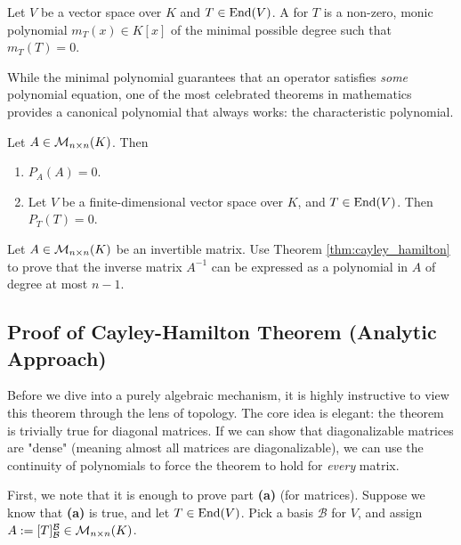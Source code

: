 \begin{definition}\label{def:minimal_poly}
  Let $V$ be a vector space over $K$ and $T \in \operatorname{End}(V)$. A  for $T$ is a non-zero, monic polynomial $m_T(x) \in K[x]$ of the minimal possible degree such that $m_T(T) = 0$.
\end{definition}

While the minimal polynomial guarantees that an operator satisfies \textit{some} polynomial equation, one of the most celebrated theorems in mathematics provides a canonical polynomial that always works: the characteristic polynomial.

\begin{theorem}\label{thm:cayley_hamilton}
  Let $A \in \mathcal{M}_{n \times n}(K)$. Then
  \begin{enumerate}
    \item  $P_A(A) = 0$.
    \item Let $V$ be a finite-dimensional vector space over $K$, and $T \in \operatorname{End}(V)$. Then $P_T(T) = 0$.
  \end{enumerate}
\end{theorem}

\begin{exercise}\label{ex:cayley_inverse}
  Let $A \in \mathcal{M}_{n \times n}(K)$ be an invertible matrix. Use Theorem \ref{thm:cayley_hamilton} to prove that the inverse matrix $A^{-1}$ can be expressed as a polynomial in $A$ of degree at most $n-1$.
\end{exercise}

\subsection*{Proof of Cayley-Hamilton Theorem (Analytic Approach)}

Before we dive into a purely algebraic mechanism, it is highly instructive to view this theorem through the lens of topology. The core idea is elegant: the theorem is trivially true for diagonal matrices. If we can show that diagonalizable matrices are "dense" (meaning almost all matrices are diagonalizable), we can use the continuity of polynomials to force the theorem to hold for \textit{every} matrix.

First, we note that it is enough to prove part \textbf{(a)} (for matrices). Suppose we know that \textbf{(a)} is true, and let $T \in \operatorname{End}(V)$. Pick a basis $\mathcal{B}$ for $V$, and assign $A := [T]_{\mathcal{B}}^{\mathcal{B}} \in \mathcal{M}_{n \times n}(K)$.

